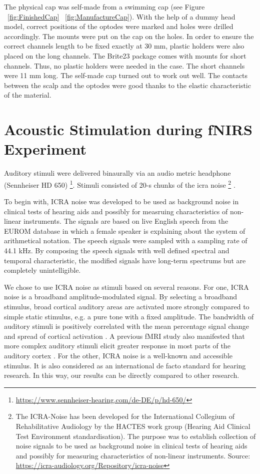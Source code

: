 The physical cap was self-made from a swimming cap (see Figure ~\ref {fig:FinishedCap} ~\ref {fig:ManufactureCap}). With the help of a dummy head model, correct positions of the optodes were marked and holes were drilled accordingly. The mounts were put on the cap on the holes. In order to ensure the correct channels length to be fixed exactly at 30 mm, plastic holders were also placed on the long channels. The Brite23 package comes with mounts for short channels. Thus, no plastic holders were needed in the case. The short channels were 11 mm long. The self-made cap turned out to work out well. The contacts between the scalp and the optodes were good thanks to the elastic characteristic of the material.



\section {Acoustic Stimulation during fNIRS Experiment}
Auditory stimuli were delivered binaurally via an audio metric headphone (Sennheiser HD 650) \footnote {\url{https://www.sennheiser-hearing.com/de-DE/p/hd-650/}}. Stimuli consisted of 20-s chunks of the \acrshort{icra} noise \footnote {The ICRA-Noise has been developed for the International Collegium of Rehabilitative Audiology by the HACTES work group (Hearing Aid Clinical Test Environment standardisation). The purpose was to establish collection of noise signals to be used as background noise in clinical tests of hearing aids and possibly for measuring characteristics of non-linear instruments. Source: \url{https://icra-audiology.org/Repository/icra-noise}} \citep {Dreschler}. 

To begin with, ICRA noise was developed to be used as background noise in clinical tests of hearing aids and possibly for measruing characteristics of non-linear instruments. The signals are based on live English speech from the EUROM database \citep {chanEUROM} in which a female speaker is explaining about the system of arithmetical notation. The speech signals were sampled with a sampling rate of 44.1 kHz. By composing the speech signals with well defined spectral and temporal characteristic, the modified signals have long-term spectrums but are completely unintelligible. 
 
We chose to use ICRA noise as stimuli based on several reasons. For one, ICRA noise is a broadband amplitude-modulated signal. By selecting a broadband stimulus, broad cortical auditory areas are activated more strongly compared to simple static stimulus, e.g. a pure tone with a fixed amplitude. The bandwidth of auditory stimuli is positively correlated with the mean percentage signal change and spread of cortical activation \citep {Hall}. A previous fMRI study also manifested that more complex auditory stimuli elicit greater response in most parts of the auditory cortex \citep {Belin2002}. For the other, ICRA noise is a well-known and accessible stimulus. It is also considered as an international de facto standard for hearing research. In this way, our results can be directly compared to other research.
 
